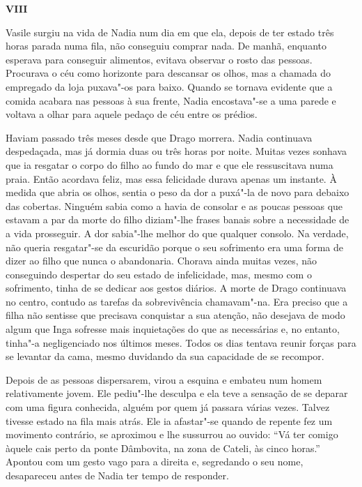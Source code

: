 \pagebreak
\movetooddpage
\vspace*{1.8cm}
\noindent{}\textbf{VIII}

\bigskip

\noindent{}Vasile surgiu na vida de Nadia num dia em que ela, depois de ter estado
três horas parada numa fila, não conseguiu comprar nada. De manhã,
enquanto esperava para conseguir alimentos, evitava observar o rosto das
pessoas. Procurava o céu como horizonte para descansar os olhos, mas a
chamada do empregado da loja puxava"-os para baixo. Quando se tornava
evidente que a comida acabara nas pessoas à sua frente, Nadia
encostava"-se a uma parede e voltava a olhar para aquele pedaço de céu
entre os prédios.

Haviam passado três meses desde que Drago morrera. Nadia continuava
despedaçada, mas já dormia duas ou três horas por noite. Muitas vezes
sonhava que ia resgatar o corpo do filho ao fundo do mar e que ele
ressuscitava numa praia. Então acordava feliz, mas essa felicidade
durava apenas um instante. À medida que abria os olhos, sentia o peso da
dor a puxá"-la de novo para debaixo das cobertas. Ninguém sabia como a
havia de consolar e as poucas pessoas que estavam a par da morte do
filho diziam"-lhe frases banais sobre a necessidade de a vida
prosseguir. A dor sabia"-lhe melhor do que qualquer consolo. Na
verdade, não queria resgatar"-se da escuridão porque o seu sofrimento era
uma forma de dizer ao filho que nunca o abandonaria. Chorava ainda
muitas vezes, não conseguindo despertar do seu estado de infelicidade,
mas, mesmo com o sofrimento, tinha de se dedicar aos gestos diários. A
morte de Drago continuava no centro, contudo as tarefas da sobrevivência
chamavam"-na. Era preciso que a filha não sentisse que precisava
conquistar a sua atenção, não desejava de modo algum que Inga sofresse
mais inquietações do que as necessárias e, no entanto, tinha"-a
negligenciado nos últimos meses. Todos os dias tentava reunir forças
para se levantar da cama, mesmo duvidando da sua capacidade de se
recompor.

Depois de as pessoas dispersarem, virou a esquina e
embateu num homem relativamente jovem. Ele pediu"-lhe desculpa e ela teve
a sensação de se deparar com uma figura conhecida, alguém por quem já
passara várias vezes. Talvez tivesse estado na fila mais atrás. Ele ia
afastar"-se quando de repente fez um movimento contrário, se aproximou
e lhe sussurrou ao ouvido: ``Vá ter comigo àquele cais perto da ponte
Dâmbovita, na zona de Cateli, às cinco horas.'' Apontou com um gesto vago
para a direita e, segredando o seu nome, desapareceu antes de Nadia ter
tempo de responder.

